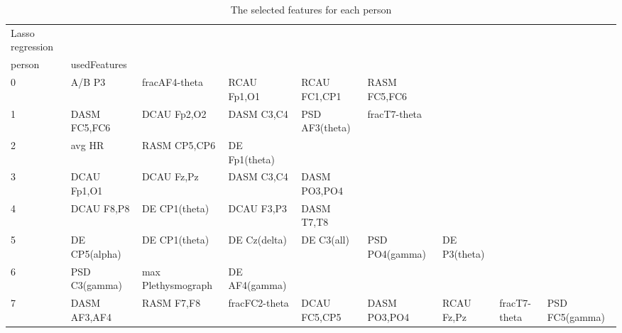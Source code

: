 \clearpage
\begin{landscape}
\begin{table}[]
\centering
\caption{The selected features for each person}
\begin{tabular}{l|llllllll}
Lasso regression   &                      &                         &                      &                    &                       &                      &                 &                 \\
person             & usedFeatures         &                         &                      &                    &                       &                      &                 &                 \\
0                  & A/B P3               & fracAF4-theta           & RCAU Fp1,O1          & RCAU FC1,CP1       & RASM FC5,FC6          &                      &                 &                 \\
1                  & DASM FC5,FC6         & DCAU Fp2,O2             & DASM C3,C4           & PSD AF3(theta)     & fracT7-theta          &                      &                 &                 \\
2                  & avg HR               & RASM CP5,CP6            & DE Fp1(theta)        &                    &                       &                      &                 &                 \\
3                  & DCAU Fp1,O1          & DCAU Fz,Pz              & DASM C3,C4           & DASM PO3,PO4       &                       &                      &                 &                 \\
4                  & DCAU F8,P8           & DE CP1(theta)           & DCAU F3,P3           & DASM T7,T8         &                       &                      &                 &                 \\
5                  & DE CP5(alpha)        & DE CP1(theta)           & DE Cz(delta)         & DE C3(all)         & PSD PO4(gamma)        & DE P3(theta)         &                 &                 \\
6                  & PSD C3(gamma)        & max Plethysmograph      & DE AF4(gamma)        &                    &                       &                      &                 &                 \\
7                  & DASM AF3,AF4         & RASM F7,F8              & fracFC2-theta        & DCAU FC5,CP5       & DASM PO3,PO4          & RCAU Fz,Pz           & fracT7-theta    & PSD FC5(gamma)  \\

\end{tabular}
\end{table}
\end{landscape}
